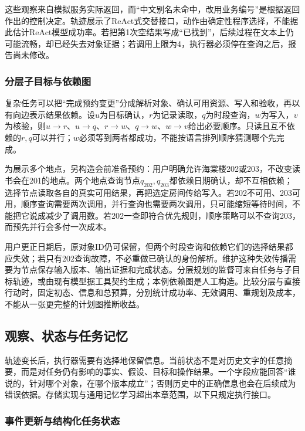 这些观察来自模拟服务实际返回，而“中文别名未命中，改用业务编号”是根据返回作出的控制决定。轨迹展示了ReAct式交替接口，动作由确定性程序选择，不能据此估计ReAct模型成功率。若把第1次空结果写成“已找到”，后续过程在文本上仍可能流畅，却已经失去对象证据；若调用上限为4，执行器必须停在查询之后，报告尚未修改。

\subsubsection{分层子目标与依赖图}
\label{sec:nlp-execution-subgoals}

复杂任务可以把“完成预约变更”分成解析对象、确认可用资源、写入和验收，再以有向边表示结果依赖。设$u$为目标确认，$r$为记录读取，$q$为时段查询，$w$为写入，$v$为核验，则$u\to r$、$u\to q$、$r\to w$、$q\to w$、$w\to v$给出必要顺序。只读且互不依赖的$r,q$可以并行；$w$必须等到两者都成功，不能按语言排列顺序猜测哪个先完成。

为展示多个地点，另构造会前准备预约：用户明确允许海棠楼202或203，不改变读书会在201的地点。两个地点查询节点$q_{202},q_{203}$都依赖日期确认，却不互相依赖；选择节点读取各自的真实可用结果，再把选定房间传给写入。若202不可用、203可用，顺序查询需要两次调用，并行查询也需要两次调用，只可能缩短等待时间，不能把它说成减少了调用数。若202一查即符合优先规则，顺序策略可以不查询203，而预先并行会多付一次成本。

用户更正日期后，原对象ID仍可保留，但两个时段查询和依赖它们的选择结果都应失效；若只有202查询故障，不必重做已确认的身份解析。维护这种失效传播需要为节点保存输入版本、输出证据和完成状态。分层规划的监督可来自任务与子目标轨迹，或由现有模型据工具契约生成；本例依赖图是人工构造。比较分层与直接行动时，固定初态、信息和总预算，分别统计成功率、无效调用、重规划及成本，不能从一张更完整的计划图推断收益。

\subsection{观察、状态与任务记忆}
\label{sec:nlp-execution-state-memory}

轨迹变长后，执行器需要有选择地保留信息。当前状态不是对历史文字的任意摘要，而是对任务仍有影响的事实、假设、目标和操作结果。一个字段应能回答“谁说的，针对哪个对象，在哪个版本成立”；否则历史中的正确信息也会在后续成为错误依据。存储实现与通用记忆学习超出本章范围，以下只规定执行接口。

\subsubsection{事件更新与结构化任务状态}
\label{sec:nlp-execution-state-update}

